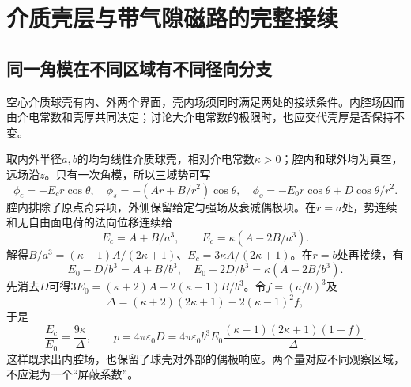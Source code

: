\section{介质壳层与带气隙磁路的完整接续}
\subsection{同一角模在不同区域有不同径向分支}
空心介质球壳有内、外两个界面，壳内场须同时满足两处的接续条件。内腔场因而由介电常数和壳厚共同决定；讨论大介电常数的极限时，也应交代壳厚是否保持不变。

取内外半径$a,b$的均匀线性介质球壳，相对介电常数$\kappa>0$；腔内和球外均为真空，远场沿$z$。只有一次角模，所以三域势可写
\[
 \phi_c=-E_c r\cos\theta,\quad
 \phi_s=-(Ar+B/r^2)\cos\theta,\quad
 \phi_o=-E_0r\cos\theta+D\cos\theta/r^2.
\]
腔内排除了原点奇异项，外侧保留给定匀强场及衰减偶极项。在$r=a$处，势连续和无自由面电荷的法向位移连续给
\[
 E_c=A+B/a^3,\qquad E_c=\kappa(A-2B/a^3).
\]
解得$B/a^3=(\kappa-1)A/(2\kappa+1)$、$E_c=3\kappa A/(2\kappa+1)$。在$r=b$处再接续，有
\[
 E_0-D/b^3=A+B/b^3,\quad
 E_0+2D/b^3=\kappa(A-2B/b^3).
\]
先消去$D$可得$3E_0=(\kappa+2)A-2(\kappa-1)B/b^3$。令$f=(a/b)^3$及
\[
 \Delta=(\kappa+2)(2\kappa+1)-2(\kappa-1)^2f,
\]
于是
\[
 \frac{E_c}{E_0}=\frac{9\kappa}{\Delta},\qquad
 p=4\pi\varepsilon_0D
 =4\pi\varepsilon_0 b^3E_0
 \frac{(\kappa-1)(2\kappa+1)(1-f)}{\Delta}.
\]
这样既求出内腔场，也保留了球壳对外部的偶极响应。两个量对应不同观察区域，不应混为一个“屏蔽系数”。

